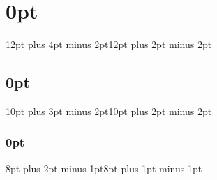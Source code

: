 \newcommand\blankpage{%
    \null
    \thispagestyle{empty}%
    \addtocounter{page}{-1}%
    \newpage}

%
%
%

\newtheorem{theorem}{Theorem}[section]
\newtheorem{lemma}[theorem]{Lemma}
\newtheorem{proposition}[theorem]{Proposition}
\newtheorem{corollary}[theorem]{Corollary}
\newtheorem{conjecture}[theorem]{Conjecture}
\newtheorem{definition}[theorem]{Definition}
\newtheorem{example}[theorem]{Example}
\newtheorem{remark}[theorem]{Remark}
\newtheorem{question}[theorem]{Question}
\newtheorem{notation}[theorem]{Notation}

%
%



\newlength{\cslhangindent}
\setlength{\cslhangindent}{1.5em}
\newlength{\csllabelwidth}
\setlength{\csllabelwidth}{3em}
\newenvironment{CSLReferences}[2] %
 {%
  \setlength{\parindent}{0pt}
  \ifodd #1 \everypar{\setlength{\hangindent}{\cslhangindent}}\ignorespaces\fi
  \ifnum #2 > 0
  \setlength{\parskip}{#2\baselineskip}
  \fi
 }%
 {}
\usepackage{calc} %
\newcommand{\CSLBlock}[1]{#1\hfill\break}
\newcommand{\CSLLeftMargin}[1]{\parbox[t]{\maxof{\widthof{#1}}{\csllabelwidth}}{#1}}
\newcommand{\CSLRightInline}[1]{\parbox[t]{\linewidth}{#1}}
\newcommand{\CSLIndent}[1]{\hspace{\cslhangindent}#1}


\renewcommand{\familydefault}{\sfdefault}
\usepackage[margin=2.5cm]{geometry}


\usepackage{titlesec}


\titlespacing\section{0pt}{12pt plus 4pt minus 2pt}{12pt plus 2pt minus 2pt}

\titlespacing\subsection{0pt}{10pt plus 3pt minus 2pt}{10pt plus 2pt minus 2pt}

\titlespacing\subsubsection{0pt}{8pt plus 2pt minus 1pt}{8pt plus 1pt minus 1pt}
\titleformat{\subsubsection}[hang]{\normalfont\normalsize}{\thesubsubsection}{1em}{}

